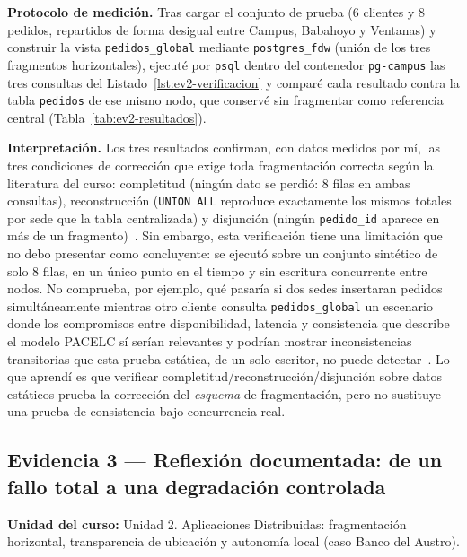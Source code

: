 \documentclass[11pt]{article}
\begin{document}
    \noindent\textbf{Protocolo de medición.}
    Tras cargar el conjunto de prueba (6 clientes y 8 pedidos, repartidos de forma desigual entre Campus, Babahoyo y Ventanas) y construir la vista \texttt{pedidos\_global} mediante \texttt{postgres\_fdw} (unión de los tres fragmentos horizontales), ejecuté por \texttt{psql} dentro del contenedor \texttt{pg-campus} las tres consultas del Listado~\ref{lst:ev2-verificacion} y comparé cada resultado contra la tabla \texttt{pedidos} de ese mismo nodo, que conservé sin fragmentar como referencia central (Tabla~\ref{tab:ev2-resultados}).

    \noindent\textbf{Interpretación.}
    Los tres resultados confirman, con datos medidos por mí, las tres condiciones de corrección que exige toda fragmentación correcta según
    la literatura del curso: completitud (ningún dato se perdió: 8 filas en ambas consultas), reconstrucción (\texttt{UNION ALL} reproduce
    exactamente los mismos totales por sede que la tabla centralizada) y disjunción (ningún \texttt{pedido\_id} aparece en más de un fragmento)~\cite{ozsu2020principles}.
    Sin embargo, esta verificación tiene una limitación que no debo presentar como concluyente: se ejecutó sobre un conjunto sintético de solo 8 filas, en un único punto
    en el tiempo y sin escritura concurrente entre nodos. No comprueba, por ejemplo, qué pasaría si dos sedes insertaran pedidos simultáneamente mientras otro cliente
    consulta \texttt{pedidos\_global} un escenario donde los compromisos entre disponibilidad, latencia y consistencia que describe el modelo PACELC sí serían relevantes y
    podrían mostrar inconsistencias transitorias que esta prueba estática, de un solo escritor, no puede detectar~\cite{abadi2012pacelc}. Lo que aprendí es que verificar
    completitud/reconstrucción/disjunción sobre datos estáticos prueba la corrección del \emph{esquema} de fragmentación, pero no sustituye una prueba de consistencia bajo
    concurrencia real.

    \subsection{Evidencia 3 --- Reflexión documentada: de un fallo total a una degradación controlada}

    \noindent\textbf{Unidad del curso:} Unidad 2. Aplicaciones Distribuidas: fragmentación horizontal, transparencia de ubicación y autonomía local (caso Banco del Austro).
\end{document}

